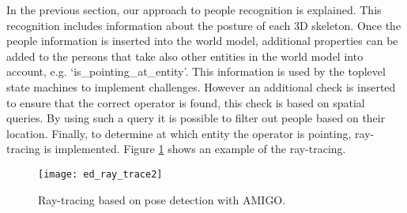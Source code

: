 In the previous section, our approach to people recognition is explained. This recognition includes information about the posture of each 3D skeleton. Once the people information is inserted into the world model, additional properties can be added to the persons that take also other entities in the world model into account, e.g. `is\_pointing\_at\_entity'. This information is used by the toplevel state machines to implement challenges. However an additional check is inserted to ensure that the correct operator is found, this check is based on spatial queries. By using such a query it is possible to filter out people based on their location. Finally, to determine at which entity the operator is pointing, ray-tracing is implemented. Figure \ref{fig:ray_trace} shows an example of the ray-tracing.

\begin{figure}[H]
	\centering
    \texttt{[image: ed\_ray\_trace2]}
	\caption{Ray-tracing based on pose detection with AMIGO.}
	\label{fig:ray_trace}
\end{figure}


